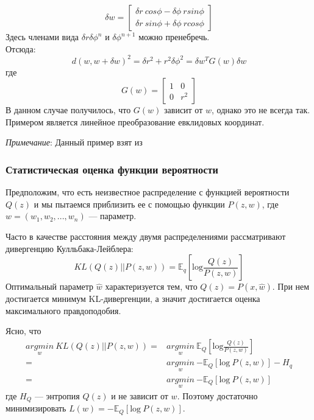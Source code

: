 \documentclass[a4paper,12pt]{article}
\begin{document}
$$
\delta w = 
\left[ 
    \begin{aligned} 
        \delta r ~ cos \phi - \delta \phi ~ r sin \phi \\
        \delta r ~ sin \phi + \delta \phi ~ r cos \phi
    \end{aligned}
\right]
$$
Здесь членами вида $\delta r \delta \phi^n$ и $\delta \phi^{n+1}$ можно пренебречь. \\
Отсюда: 
$$d(w, w + \delta w)^2 = \delta r^2 + r^2 \delta \phi^2 = \delta w^TG(w)\delta w$$
где
$$
G(w) = 
\begin{bmatrix}
    1 & 0 \\
    0 & r^2
\end{bmatrix}
$$ \label{PolarTensor}
В данном случае получилось, что $G(w)$ зависит от $w$, однако это не всегда так. Примером является линейное преобразование евклидовых координат.

\emph{Примечание}:
    Данный пример взят из \cite{AmariWhy}

\newpage

\subsubsection{Статистическая оценка функции вероятности}

Предположим, что есть неизвестное распределение с функцией вероятности $Q(z)$ и мы пытаемся приблизить ее с помощью
функции $P(z, w)$, где $w = (w_1, w_2, ..., w_n)$ --- параметр.

Часто в качестве расстояния между двумя распределениями рассматривают дивергенцию Кулльбака-Лейблера:
$$KL(Q(z) || P(z, w)) = \mathbb{E}_q\left[\mbox{log} \frac{Q(z)}{P(z, w)}\right] $$
Оптимальный параметр $\hat{w}$ характеризуется тем, что $Q(z) = P(x, \hat{w})$. При нем достигается минимум KL-дивергенции, а значит достигается оценка максимального правдоподобия.

Ясно, что
$$ 
\begin{aligned}
    \underset{w}{argmin} ~ KL(Q(z) || P(z, w)) 
    = & \underset{w}{argmin} ~ \mathbb{E}_Q\left[\mbox{log} \frac{Q(z)}{P(z, w)}\right] \\
    = & \underset{w}{argmin} ~ \mathbb{-E}_Q\left[\mbox{log} ~ P(z, w)\right] - H_q \\
    = & \underset{w}{argmin} ~ \mathbb{-E}_Q\left[\mbox{log} ~ P(z, w)\right]
\end{aligned}
$$ где $H_Q$ --- энтропия $Q(z)$ и не зависит от $w$. Поэтому достаточно минимизировать $L(w) = \mathbb{-E}_Q\left[\mbox{log} ~ P(z, w)\right]$.
\end{document}
